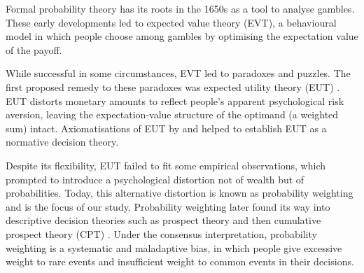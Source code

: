 \documentclass[a4paper, 12pt]{article}
\newcommand{\ie}{\textit{i.e.}\xspace}
\begin{document}
Formal probability theory has its roots in the 1650s as a tool to analyse gambles. These early developments led to expected value theory (EVT), a behavioural model in which people choose among gambles by optimising the expectation value of the payoff.


While successful in some circumstances, EVT led to paradoxes and puzzles. The first proposed remedy to these paradoxes was expected utility theory (EUT) \parencite{Bernoulli1738,Laplace1814}.
EUT distorts monetary amounts to reflect people's apparent psychological risk aversion, leaving the expectation-value structure of the optimand (a weighted sum) intact.
Axiomatisations of EUT by \textcite{vonNeumannMorgenstern1944} and \textcite{Savage1954} helped to establish EUT as a normative decision theory.

Despite its flexibility, EUT failed to fit some empirical observations, which prompted \textcite{PrestonBaratta1948} to introduce a psychological distortion not of wealth but of probabilities.
Today, this alternative distortion is known as probability weighting and is the focus of our study.
Probability weighting later found its way into descriptive decision theories such as prospect theory \parencite{KahnemanTversky1979} and then cumulative prospect theory (CPT) \parencite{TverskyKahneman1992}.
Under the consensus interpretation, probability weighting is a systematic and maladaptive bias, in which people give excessive weight to rare events and insufficient weight to common events in their decisions.
\end{document}
